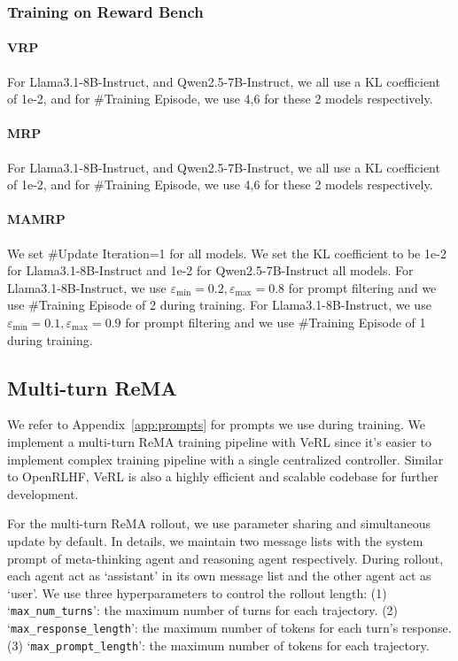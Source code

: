 \subsubsection{Training on Reward Bench}
\label{app:exp_setting.single_turn_rema.reward_bench}
\paragraph{VRP}
For Llama3.1-8B-Instruct, and Qwen2.5-7B-Instruct, we all use a KL coefficient of 1e-2, and for \#Training Episode, we use 4,6 for these 2 models respectively.
\paragraph{MRP}
For Llama3.1-8B-Instruct, and Qwen2.5-7B-Instruct, we all use a KL coefficient of 1e-2, and for \#Training Episode, we use 4,6 for these 2 models respectively.
\paragraph{MAMRP}
We set \#Update Iteration=1 for all models. We set the KL coefficient to be 1e-2 for Llama3.1-8B-Instruct and 1e-2 for Qwen2.5-7B-Instruct all models.
For Llama3.1-8B-Instruct, we use $\varepsilon_{\min}=0.2, \varepsilon_{\max}=0.8$ for prompt filtering and we use \#Training Episode of 2 during training.
For Llama3.1-8B-Instruct, we use $\varepsilon_{\min}=0.1, \varepsilon_{\max}=0.9$ for prompt filtering and we use \#Training Episode of 1 during training.

\subsection{Multi-turn ReMA}
\label{app:exp_setting.multi_turn_rema}
We refer to Appendix~\ref{app:prompts} for prompts we use during training. We implement a multi-turn ReMA training pipeline with VeRL \citep{sheng2024hybridflow} since it's easier to implement complex training pipeline with a single centralized controller. Similar to OpenRLHF, VeRL is also a highly efficient and scalable codebase for further development.

For the multi-turn ReMA rollout, we use parameter sharing and simultaneous update by default. In details, we maintain two message lists with the system prompt of meta-thinking agent and reasoning agent respectively. During rollout, each agent act as `assistant' in its own message list and the other agent act as `user'.
We use three hyperparameters to control the rollout length: 
(1) `\texttt{max\_num\_turns}': the maximum number of turns for each trajectory.
(2) `\texttt{max\_response\_length}': the maximum number of tokens for each turn's response.
(3) `\texttt{max\_prompt\_length}': the maximum number of tokens for each trajectory.

